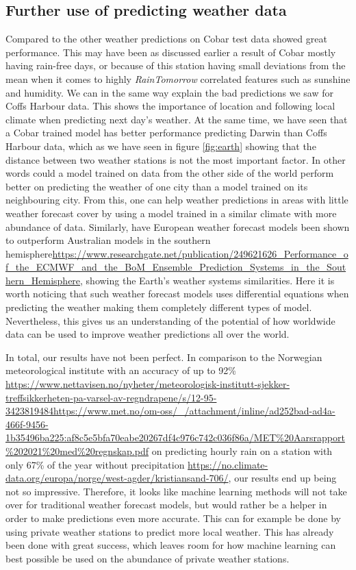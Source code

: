 \documentclass[11pt]{article}
\begin{document}
\subsection{Further use of predicting weather data}
Compared to the other weather predictions on Cobar test data showed great performance. This may have been as discussed earlier a result of Cobar mostly having rain-free days, or because of this station having small deviations from the mean when it comes to highly \textit{RainTomorrow} correlated features such as sunshine and humidity. We can in the same way explain the bad predictions we saw for Coffs Harbour data. This shows the importance of location and following local climate when predicting next day's weather.
At the same time, we have seen that a Cobar trained model has better performance predicting Darwin than Coffs Harbour data, which as we have seen in figure \ref{fig:earth} showing that the distance between two weather stations is not the most important factor. In other words could a model trained on data from the other side of the world perform better on predicting the weather of one city than a model trained on its neighbouring city. From this, one can help weather predictions in areas with little weather forecast cover by using a model trained in a similar climate with more abundance of data. Similarly, have European weather forecast models been shown to outperform Australian models in the southern hemisphere\url{https://www.researchgate.net/publication/249621626_Performance_of_the_ECMWF_and_the_BoM_Ensemble_Prediction_Systems_in_the_Southern_Hemisphere}, showing the Earth's weather systems similarities. Here it is worth noticing that such weather forecast models uses differential equations when predicting the weather making them completely different types of model. Nevertheless, this gives us an understanding of the potential of how worldwide data can be used to improve weather predictions all over the world.

In total, our results have not been perfect. In comparison to the Norwegian meteorological institute with an accuracy of up to 92\% \url{https://www.nettavisen.no/nyheter/meteorologisk-institutt-sjekker-treffsikkerheten-pa-varsel-av-regndrapene/s/12-95-3423819484}\url{https://www.met.no/om-oss/_/attachment/inline/ad252bad-ad4a-466f-9456-1b35496ba225:af8c5e5bfa70eabe20267df4c976c742c036f86a/MET%20Aarsrapport%202021%20med%20regnskap.pdf} on predicting hourly rain on a station with only 67\% of the year without precipitation \url{https://no.climate-data.org/europa/norge/west-agder/kristiansand-706/}, our results end up being not so impressive. Therefore, it looks like machine learning methods will not take over for traditional weather forecast models, but would rather be a helper in order to make predictions even more accurate. This can for example be done by using private weather stations to predict more local weather. This has already been done with great success, which leaves room for how  machine learning can best possible be used on the abundance of private weather stations. 
\end{document}

